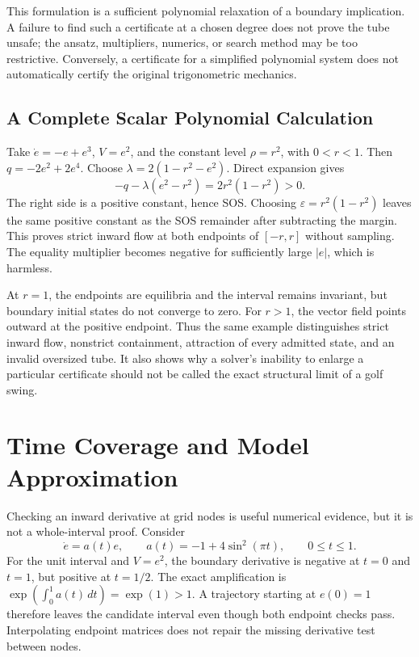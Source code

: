 This formulation is a sufficient polynomial relaxation of a boundary implication. A failure to find such a certificate at a chosen degree does not prove the tube unsafe; the ansatz, multipliers, numerics, or search method may be too restrictive. Conversely, a certificate for a simplified polynomial system does not automatically certify the original trigonometric mechanics.

\subsection{A Complete Scalar Polynomial Calculation}

Take $\dot e=-e+e^3$, $V=e^2$, and the constant level $\rho=r^2$, with $0<r<1$. Then $q=-2e^2+2e^4$. Choose $\lambda=2(1-r^2-e^2)$. Direct expansion gives
\begin{equation}
 -q-\lambda(e^2-r^2)=2r^2(1-r^2)>0.
 \label{eq:funnel_polynomial_identity}
\end{equation}
The right side is a positive constant, hence SOS. Choosing $\varepsilon=r^2(1-r^2)$ leaves the same positive constant as the SOS remainder after subtracting the margin. This proves strict inward flow at both endpoints of $[-r,r]$ without sampling. The equality multiplier becomes negative for sufficiently large $|e|$, which is harmless.

At $r=1$, the endpoints are equilibria and the interval remains invariant, but boundary initial states do not converge to zero. For $r>1$, the vector field points outward at the positive endpoint. Thus the same example distinguishes strict inward flow, nonstrict containment, attraction of every admitted state, and an invalid oversized tube. It also shows why a solver's inability to enlarge a particular certificate should not be called the exact structural limit of a golf swing.

\section{Time Coverage and Model Approximation}

Checking an inward derivative at grid nodes is useful numerical evidence, but it is not a whole-interval proof. Consider
\begin{equation}
 \dot e=a(t)e,\qquad a(t)=-1+4\sin^2(\pi t),\qquad 0\leq t\leq1.
 \label{eq:funnel_time_sampling}
\end{equation}
For the unit interval and $V=e^2$, the boundary derivative is negative at $t=0$ and $t=1$, but positive at $t=1/2$. The exact amplification is $\exp(\int_0^1a(t)\,dt)=\exp(1)>1$. A trajectory starting at $e(0)=1$ therefore leaves the candidate interval even though both endpoint checks pass. Interpolating endpoint matrices does not repair the missing derivative test between nodes.

